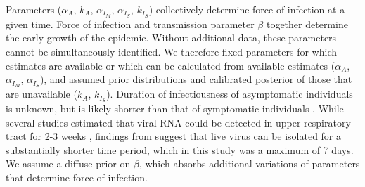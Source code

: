 \documentclass[11pt]{article}
\begin{document}
Parameters ($\alpha_A$, $k_A$, $\alpha_{I_M}$, $\alpha_{I_S}$, $k_{I_S}$) collectively determine force of infection at a given time. Force of infection and transmission parameter $\beta$ together
determine the early growth of the epidemic. Without additional data, these parameters cannot be simultaneously identified. We therefore fixed parameters for which estimates are available or which can be calculated from available estimates ($\alpha_A$, $\alpha_{I_M}$, $\alpha_{I_S}$), and assumed prior distributions and calibrated posterior of those that are unavailable ($k_A$, $k_{I_S}$). 
Duration of infectiousness of asymptomatic individuals is unknown, but is likely shorter than that of symptomatic individuals \citep{yang2020comparison}. While several studies estimated that viral RNA could be detected in upper respiratory tract for 2-3 weeks \citep{young2020epidemiologic, kujawski2020clinical}, findings from \citep{wolfel2020virological} suggest that live virus can be isolated for a substantially shorter time period, which in this study was a maximum of 7 days. 
We assume a diffuse prior on $\beta$, which absorbs additional variations of parameters that determine force of infection. 
\end{document}
